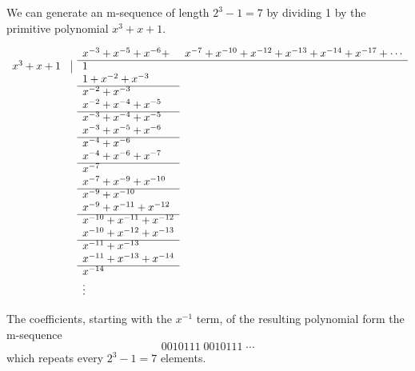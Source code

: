 {%
\begin{example}
\label{ex:1/p(x)}
We can generate an m-sequence of length 
$2^3-1=7$ by dividing 1 by the primitive polynomial $x^3+x+1$.




\begin{fsL}
\[
\begin{array}{rrll}
           &   & x^{-3} + x^{-5} + x^{-6} +& x^{-7} + x^{-10} + x^{-12} + x^{-13} + x^{-14} + x^{-17} + \cdots \\
   \cline{3-4}
   x^3+x+1 & \vline & 1 \\
           &        & 1 + x^{-2} + x^{-3} \\
   \cline{3-3}
           &        & x^{-2} + x^{-3} \\
           &        & x^{-2} + x^{-4} + x^{-5} \\
   \cline{3-3}
           &        & x^{-3} + x^{-4} + x^{-5} \\
           &        & x^{-3} + x^{-5} + x^{-6} \\
   \cline{3-3}
           &        & x^{-4} + x^{-6}          \\
           &        & x^{-4} + x^{-6} + x^{-7} \\
   \cline{3-3}
           &        & x^{-7}                   \\
           &        & x^{-7} + x^{-9} + x^{-10} \\
   \cline{3-3}
           &        & x^{-9} + x^{-10}         \\
           &        & x^{-9} + x^{-11} + x^{-12} \\
   \cline{3-3}
           &        & x^{-10} + x^{-11} + x^{-12} \\
           &        & x^{-10} + x^{-12} + x^{-13} \\
   \cline{3-3}
           &        & x^{-11} + x^{-13}          \\
           &        & x^{-11} + x^{-13} + x^{-14} \\
   \cline{3-3}
           &        & x^{-14}           \\
           &        & \vdots           
\end{array}
\]
\end{fsL}
The coefficients, starting with the $x^{-1}$ term, 
of the resulting polynomial form the m-sequence
\[ 0010111 \; 0010111 \; \cdots \]
which repeats every $2^3-1=7$ elements.
\end{example}


}
